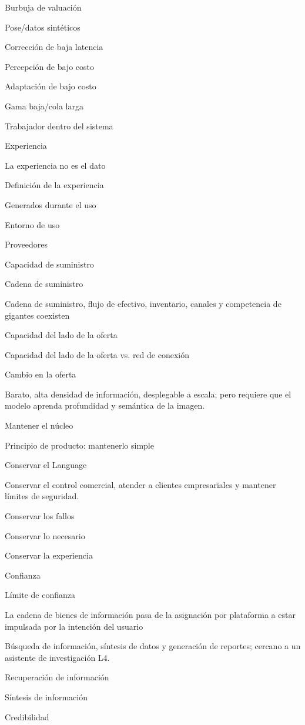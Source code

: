 \documentclass{article}
\begin{document}
Burbuja de valuación

Pose/datos sintéticos

Corrección de baja latencia

Percepción de bajo costo

Adaptación de bajo costo

Gama baja/cola larga

Trabajador dentro del sistema

Experiencia

La experiencia no es el dato

Definición de la experiencia

Generados durante el uso

Entorno de uso

Proveedores

Capacidad de suministro

Cadena de suministro

Cadena de suministro, flujo de efectivo, inventario, canales y competencia de gigantes coexisten

Capacidad del lado de la oferta

Capacidad del lado de la oferta vs. red de conexión

Cambio en la oferta

Barato, alta densidad de información, desplegable a escala; pero requiere que el modelo aprenda profundidad y semántica de la imagen.

Mantener el núcleo

Principio de producto: mantenerlo simple

Conservar el Language

Conservar el control comercial, atender a clientes empresariales y mantener límites de seguridad.

Conservar los fallos

Conservar lo necesario

Conservar la experiencia

Confianza

Límite de confianza

La cadena de bienes de información pasa de la asignación por plataforma a estar impulsada por la intención del usuario

Búsqueda de información, síntesis de datos y generación de reportes; cercano a un asistente de investigación L4.

Recuperación de información

Síntesis de información

Credibilidad
\end{document}
